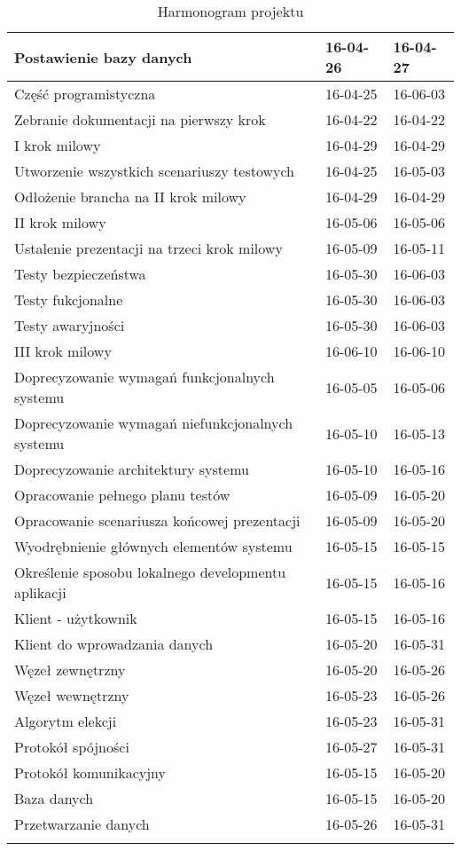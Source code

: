 \begin{longtable}{| p{} || p{} | p{} |}
Postawienie bazy danych & 16-04-26 & 16-04-27 \\ \hline
Część programistyczna & 16-04-25 & 16-06-03 \\ \hline
Zebranie dokumentacji na pierwszy krok & 16-04-22 & 16-04-22 \\ \hline
I krok milowy & 16-04-29 & 16-04-29 \\ \hline
Utworzenie wszystkich scenariuszy testowych & 16-04-25 & 16-05-03 \\ \hline
Odłożenie brancha na II krok milowy & 16-04-29 & 16-04-29 \\ \hline
II krok milowy & 16-05-06 & 16-05-06 \\ \hline
Ustalenie prezentacji na trzeci krok milowy & 16-05-09 & 16-05-11 \\ \hline
Testy bezpieczeństwa & 16-05-30 & 16-06-03 \\ \hline
Testy fukcjonalne & 16-05-30 & 16-06-03 \\ \hline
Testy awaryjności & 16-05-30 & 16-06-03 \\ \hline
III krok milowy & 16-06-10 & 16-06-10 \\ \hline
Doprecyzowanie wymagań funkcjonalnych systemu & 16-05-05 & 16-05-06 \\ \hline
Doprecyzowanie wymagań niefunkcjonalnych systemu & 16-05-10 & 16-05-13 \\ \hline
Doprecyzowanie architektury systemu & 16-05-10 & 16-05-16 \\ \hline
Opracowanie pełnego planu testów & 16-05-09 & 16-05-20 \\ \hline
Opracowanie scenariusza końcowej prezentacji & 16-05-09 & 16-05-20 \\ \hline
Wyodrębnienie głównych elementów systemu & 16-05-15 & 16-05-15 \\ \hline
Określenie sposobu lokalnego developmentu aplikacji & 16-05-15 & 16-05-16 \\ \hline
Klient - użytkownik & 16-05-15 & 16-05-16 \\ \hline
Klient do wprowadzania danych & 16-05-20 & 16-05-31 \\ \hline
Węzeł zewnętrzny & 16-05-20 & 16-05-26 \\ \hline
Węzeł wewnętrzny & 16-05-23 & 16-05-26 \\ \hline
Algorytm elekcji & 16-05-23 & 16-05-31 \\ \hline
Protokół spójności & 16-05-27 & 16-05-31 \\ \hline
Protokół komunikacyjny & 16-05-15 & 16-05-20 \\ \hline
Baza danych & 16-05-15 & 16-05-20 \\ \hline
Przetwarzanie danych & 16-05-26 & 16-05-31 \\ \hline

\caption{Harmonogram projektu}
\label{tab:harmonogram}
\end{longtable} 



